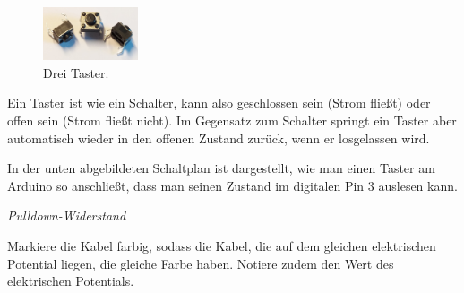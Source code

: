 \begin{figure}
	\centering
	\includegraphics[width=0.25\textwidth]{pics/taster.jpg}
	\caption{Drei Taster.}
\end{figure}
Ein Taster ist wie ein Schalter, kann also geschlossen sein (Strom fließt) oder offen sein (Strom fließt nicht). Im Gegensatz zum Schalter springt ein Taster aber automatisch wieder in den offenen Zustand zurück, wenn er losgelassen wird.
 
In der unten abgebildeten Schaltplan ist dargestellt, wie man einen Taster am Arduino so anschließt, dass man seinen Zustand im digitalen Pin 3 auslesen kann.

\begin{aufgabe}\emph{Pulldown-Widerstand}
	
	Markiere die Kabel farbig, sodass die Kabel, die auf dem gleichen elektrischen Potential liegen, die gleiche Farbe haben. Notiere zudem den Wert des elektrischen Potentials.
\end{aufgabe}

